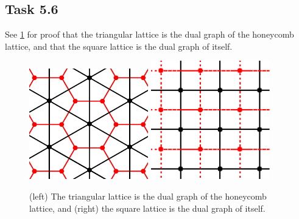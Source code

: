\documentclass[a4paper]{article}
\begin{document}
\subsection*{Task 5.6}
See \cref{fig:dualgraphs} for proof that the triangular lattice is the dual graph of the honeycomb lattice, and that the square lattice is the dual graph of itself.
\begin{figure}[h]%
    \centering%
    \includegraphics[width=0.46\textwidth]{dual_graph_honeycomb.pdf}%
    \hspace{0.06\textwidth}%
    \includegraphics[width=0.46\textwidth]{dual_graph_square.pdf}%
    \caption{(left) The triangular lattice is the dual graph of the honeycomb lattice, and (right) the square lattice is the dual graph of itself.\label{fig:dualgraphs}}%
\end{figure}
\FloatBarrier
\end{document}
